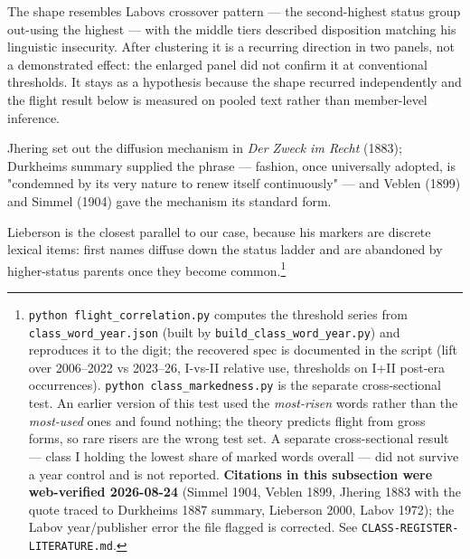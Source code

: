 The shape resembles Labov\textquotesingle s crossover pattern --- the second-highest status
group out-using the highest --- with the middle tier\textquotesingle s described disposition
matching his linguistic insecurity. After clustering it is a recurring
direction in two panels, not a demonstrated effect: the enlarged panel did not
confirm it at conventional thresholds. It stays as a hypothesis because the
shape recurred independently and the flight result below is measured on pooled
text rather than member-level inference.

Jhering set out the diffusion mechanism in \emph{Der Zweck im Recht} (1883);
Durkheim\textquotesingle s summary supplied the phrase --- fashion, once universally adopted, is
"condemned by its very nature to renew itself continuously" --- and Veblen
(1899) and Simmel (1904) gave the mechanism its standard form.

Lieberson is the closest parallel to our case, because his markers are discrete
lexical items: first names diffuse down the status ladder and are abandoned by
higher-status parents once they become common.\footnote{\texttt{python\ flight\_\allowbreak{}correlation.\allowbreak{}py} computes the threshold series from
  \texttt{class\_word\_year.json} (built by \texttt{build\_\allowbreak{}class\_\allowbreak{}word\_\allowbreak{}year.\allowbreak{}py}) and
  reproduces it to the digit; the recovered spec is documented in the
  script (lift over 2006--2022 vs 2023--26, I-vs-II relative use, thresholds
  on I+II post-era occurrences). \texttt{python\ class\_\allowbreak{}markedness.\allowbreak{}py} is the
  separate cross-sectional test. An earlier
  version of this test used the \emph{most-risen} words rather than the
  \emph{most-used} ones and found nothing; the theory predicts flight from gross
  forms, so rare risers are the wrong test set. A separate cross-sectional
  result --- class I holding the lowest share of marked words overall --- did
  not survive a year control and is not reported. \textbf{Citations in this
  subsection were web-verified 2026-08-24} (Simmel 1904\cite{simmel1904}, Veblen 1899\cite{veblen1899},
  Jhering 1883\cite{jhering1883} with the quote traced to Durkheim\textquotesingle s 1887\cite{durkheim1887} summary, Lieberson 2000\cite{lieberson2000}, Labov 1972\cite{labov1972}); the Labov year/publisher error the file flagged is
  corrected. See \texttt{CLASS-\allowbreak{}REGISTER-\allowbreak{}LITERATURE.\allowbreak{}md}.}

